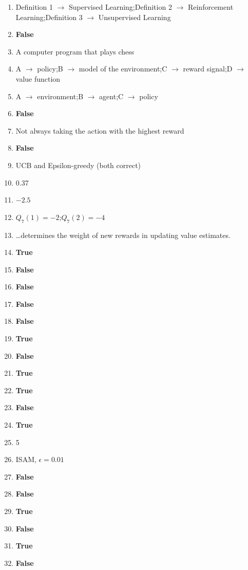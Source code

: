\documentclass[11pt,oneside]{article}
\begin{document}
\begin{enumerate}[label=\textbf{Q\arabic*.}, leftmargin=3em, itemsep=4pt]

  \item Definition 1 $\rightarrow$ Supervised Learning;\quad Definition 2 $\rightarrow$ Reinforcement Learning;\quad Definition 3 $\rightarrow$ Unsupervised Learning
  \item \textbf{False}
  \item A computer program that plays chess
  \item A $\rightarrow$ policy;\quad B $\rightarrow$ model of the environment;\quad C $\rightarrow$ reward signal;\quad D $\rightarrow$ value function
  \item A $\rightarrow$ environment;\quad B $\rightarrow$ agent;\quad C $\rightarrow$ policy
  \item \textbf{False}
  \item Not always taking the action with the highest reward
  \item \textbf{False}

  \item UCB and Epsilon-greedy (both correct)
  \item 0.37
  \item $-2.5$
  \item $Q_7(1) = -2$;\quad $Q_7(2) = -4$
  \item \ldots determines the weight of new rewards in updating value estimates.
  \item \textbf{True}
  \item \textbf{False}
  \item \textbf{False}
  \item \textbf{False}
  \item \textbf{False}
  \item \textbf{True}
  \item \textbf{False}
  \item \textbf{True}
  \item \textbf{True}
  \item \textbf{False}
  \item \textbf{True}
  \item 5
  \item ISAM, $\epsilon = 0.01$
  \item \textbf{False}
  \item \textbf{False}
  \item \textbf{True}
  \item \textbf{False}
  \item \textbf{True}
  \item \textbf{False}


\end{enumerate}
\end{document}
